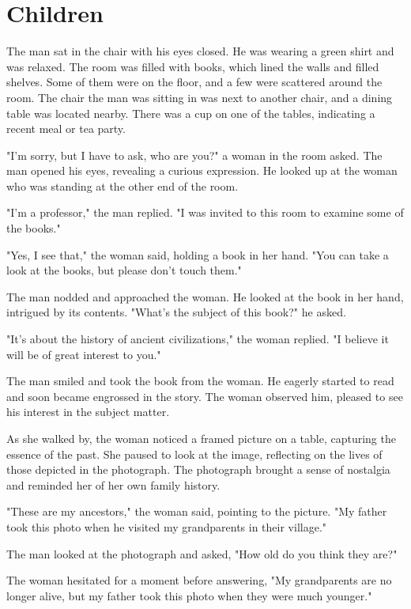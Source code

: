 \documentclass[smalldemyvopaper,11pt,twoside,onecolumn,openright,extrafontsizes]{memoir}
\begin{document}
\chapter{Children}
The man sat in the chair with his eyes closed. He was wearing a green shirt and was relaxed. The room was filled with books, which lined the walls and filled shelves. Some of them were on the floor, and a few were scattered around the room. The chair the man was sitting in was next to another chair, and a dining table was located nearby. There was a cup on one of the tables, indicating a recent meal or tea party.\par
"I'm sorry, but I have to ask, who are you?" a woman in the room asked. The man opened his eyes, revealing a curious expression. He looked up at the woman who was standing at the other end of the room.\par
"I'm a professor," the man replied. "I was invited to this room to examine some of the books."\par
"Yes, I see that," the woman said, holding a book in her hand. "You can take a look at the books, but please don't touch them."\par
The man nodded and approached the woman. He looked at the book in her hand, intrigued by its contents. "What's the subject of this book?" he asked.\par
"It's about the history of ancient civilizations," the woman replied. "I believe it will be of great interest to you."\par
The man smiled and took the book from the woman. He eagerly started to read and soon became engrossed in the story. The woman observed him, pleased to see his interest in the subject matter.\par
As she walked by, the woman noticed a framed picture on a table, capturing the essence of the past. She paused to look at the image, reflecting on the lives of those depicted in the photograph. The photograph brought a sense of nostalgia and reminded her of her own family history.\par
"These are my ancestors," the woman said, pointing to the picture. "My father took this photo when he visited my grandparents in their village."\par
The man looked at the photograph and asked, "How old do you think they are?"\par
The woman hesitated for a moment before answering, "My grandparents are no longer alive, but my father took this photo when they were much younger."\par
\end{document}
